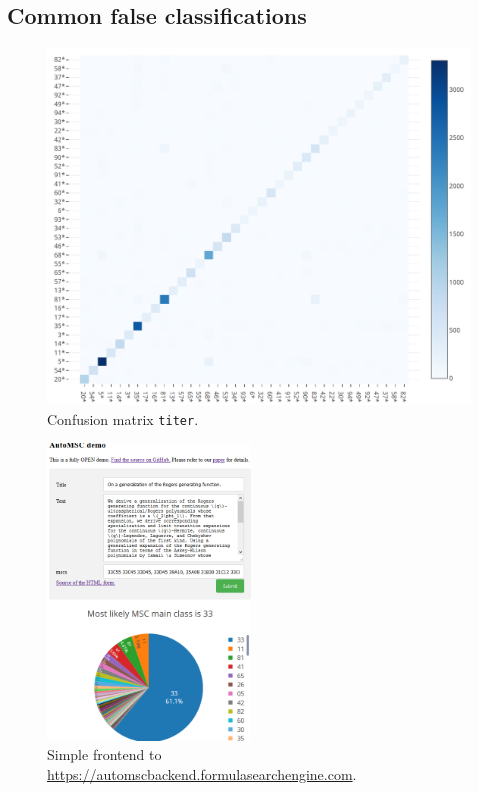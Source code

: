 \subsection{Common false classifications}
\begin{figure}[h]
  \centering
  \includegraphics[width=1.1\textwidth]{confusion.png}
  \caption{Confusion matrix \texttt{titer}.}\label{fgConfusion}
\end{figure}
\begin{figure}
  \begin{center}
    \includegraphics[width=0.48\textwidth]{webFrontend.png}
  \end{center}
  \caption{Simple frontend to
  \url{https://automscbackend.formulasearchengine.com}.}\label{fgScreenshot}
\end{figure}
